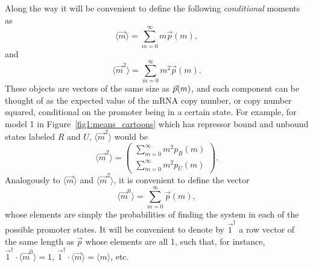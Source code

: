 Along the way it will be convenient to define the following
\textit{conditional} moments as
\begin{equation}
\langle\vec{m}\rangle = \sum_{m=0}^\infty m \vec{p}(m),
\end{equation}
and
\begin{equation}
\langle\vec{m}^2\rangle = \sum_{m=0}^\infty m^2 \vec{p}(m).
\end{equation}
These objects are vectors of the same size as $\vec{p}(m)$, and each component
can be thought of as the expected value of the mRNA copy number, or copy number
squared, conditional on the promoter being in a certain state. For example, for
model 1 in Figure~\ref{fig1:means_cartoons} which has repressor bound and
unbound states labeled $R$ and $U$, $\langle\vec{m}^2\rangle$ would be
\begin{equation}
\langle\vec{m}^2\rangle
= \begin{pmatrix} \sum_{m=0}^\infty m^2 p_R(m)
                \\ \sum_{m=0}^\infty m^2 p_U(m) \end{pmatrix}.
\end{equation}
Analogously to $\langle\vec{m}\rangle$ and $\langle\vec{m}^2\rangle$,
it is convenient to define the vector
\begin{equation}
\langle\vec{m}^0\rangle = \sum_{m=0}^\infty \vec{p}(m),
\end{equation}
whose elements are simply the probabilities of finding the system in each of the
possible promoter states. It will be
convenient to denote by $\vec{1}^\dagger$ a row vector of the same length as
$\vec{p}$ whose elements are all 1, such that, for instance, $\vec{1}^\dagger
\cdot \langle\vec{m}^0\rangle = 1$, $\vec{1}^\dagger \cdot \langle\vec{m}\rangle
= \langle{m}\rangle$, etc.

